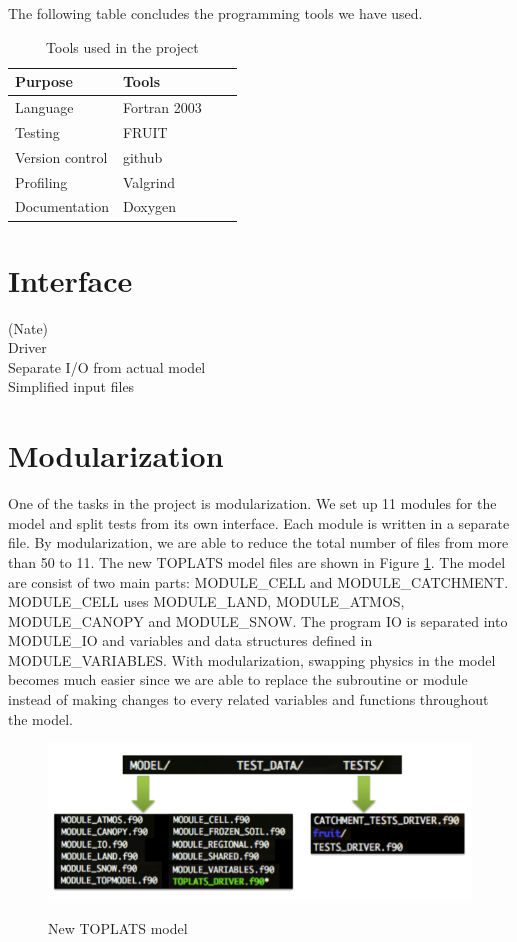 \documentclass[pdftex,12pt,a4paper]{article}
\begin{document}
The following table concludes the programming tools we have used.

\begin{table}[h]
  \begin{center}
    \caption{Tools used in the project}
    \begin{tabular}{ | l | l | l | p{5cm} |}
    \hline
    Purpose & Tools \\ \hline
    Language & Fortran 2003 \\
    Testing & FRUIT \\ 
    Version control & github \\ 
    Profiling & Valgrind \\ 
    Documentation & Doxygen \\ \hline
    \end{tabular}
  \end{center}
\end{table}

\section{Interface}
{(Nate)}
{\\ Driver}
{\\ Separate I/O from actual model}
{\\ Simplified input files}

\section{Modularization}
One of the tasks in the project is modularization. We set up 11 modules for the model and split tests from its own interface. Each module is written in a separate file. By modularization, we are able to reduce the total number of files from more than 50 to 11. The new TOPLATS model files are shown in Figure \ref{Modules1}. The model are consist of two main parts: MODULE\_CELL and MODULE\_CATCHMENT. MODULE\_CELL uses MODULE\_LAND, MODULE\_ATMOS, MODULE\_CANOPY and MODULE\_SNOW. The program IO is separated into MODULE\_IO and variables and data structures defined in MODULE\_VARIABLES. With modularization, swapping physics in the model becomes much easier since we are able to replace the subroutine or module instead of making changes to every related variables and functions throughout the model.

\begin{figure}[h]
	\centering
	\includegraphics[width=4.5in]{Figures/Modules1.png}
	\label{Modules1}
	\caption{New TOPLATS model}
\end{figure}
\end{document}
